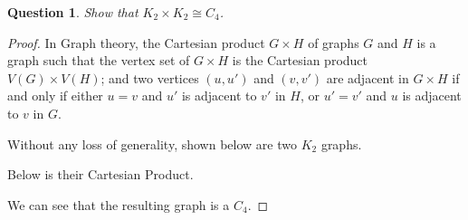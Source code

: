 \documentclass{article}
\newtheorem{question}{Question}
\begin{document}
\begin{question}
    Show that $K_2 \times K_2 \cong C_4$.
\end{question}

\begin{proof}
    In Graph theory, the Cartesian product 
    $G \times H$ of graphs $G$ and $H$ is a graph such that the vertex set
    of $G \times H$ is the Cartesian product $V(G) \times V(H)$; and two vertices $(u,u')$ and $(v,v')$ are adjacent in $G \times H$ if and only if either $u = v$ and $u'$ is adjacent to $v'$ in $H$, or $u' = v'$ and $u$ is adjacent to $v$ in $G$.
    
    Without any loss of generality, shown below are two $K_2$ graphs. \\
    
   \begin{center}

            \end{center}
            Below is their Cartesian Product.
            
            \begin{center}
            
    \end{center}
    We can see that the resulting graph is a $C_4$.
\end{proof}
\end{document}
